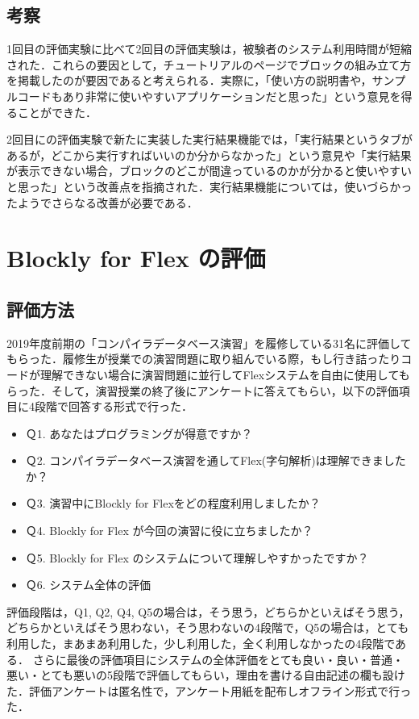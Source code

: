 \documentclass{risepaper}
\begin{document}
		\subsection{考察}
        
1回目の評価実験に比べて2回目の評価実験は，被験者のシステム利用時間が短縮された．これらの要因として，チュートリアルのページでブロックの組み立て方を掲載したのが要因であると考えられる．実際に，「使い方の説明書や，サンプルコードもあり非常に使いやすいアプリケーションだと思った」という意見を得ることができた．

2回目にの評価実験で新たに実装した実行結果機能では，「実行結果というタブがあるが，どこから実行すればいいのか分からなかった」という意見や「実行結果が表示できない場合，ブロックのどこが間違っているのかが分かると使いやすいと思った」という改善点を指摘された．実行結果機能については，使いづらかったようでさらなる改善が必要である．

   \section{Blockly for Flex の評価}
   
   		\subsection{評価方法}
        
2019年度前期の「コンパイラデータベース演習」を履修している31名に評価してもらった．履修生が授業での演習問題に取り組んでいる際，もし行き詰ったりコードが理解できない場合に演習問題に並行してFlexシステムを自由に使用してもらった．そして，演習授業の終了後にアンケートに答えてもらい，以下の評価項目に4段階で回答する形式で行った．
\begin{itemize}
\item Ｑ1. あなたはプログラミングが得意ですか？
\item Ｑ2. コンパイラデータベース演習を通してFlex(字句解析)は理解できましたか？
\item Ｑ3. 演習中にBlockly for Flexをどの程度利用しましたか？
\item Ｑ4. Blockly for Flex が今回の演習に役に立ちましたか？
\item Ｑ5. Blockly for Flex のシステムについて理解しやすかったですか？
\item Ｑ6. システム全体の評価
\end{itemize} 
評価段階は，Q1, Q2, Q4, Q5の場合は，そう思う，どちらかといえばそう思う，どちらかといえばそう思わない，そう思わないの4段階で，Q5の場合は，とても利用した，まあまあ利用した，少し利用した，全く利用しなかったの4段階である．
さらに最後の評価項目にシステムの全体評価をとても良い・良い・普通・悪い・とても悪いの5段階で評価してもらい，理由を書ける自由記述の欄も設けた．評価アンケートは匿名性で，アンケート用紙を配布しオフライン形式で行った．
\end{document}
